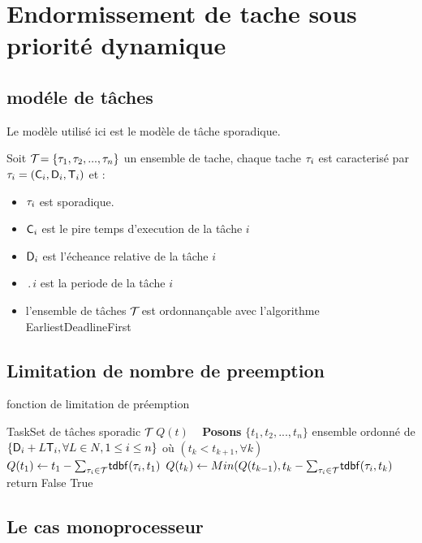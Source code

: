 \chapter{Endormissement de tache sous priorité dynamique}
\minitoc
\section{modéle de tâches}
Le modèle utilisé ici est le modèle de tâche sporadique.

Soit $\mathcal{T}_{} = \{\tau_{1},\tau_{2},...,\tau_{n}\}$ un ensemble de
tache, chaque tache $\tau_{i}$ est caracterisé par $\tau_{i} =
(\mathsf{C}_{i},\mathsf{D}_{i},\mathsf{T}_{i})$ et :

\begin{itemize}
\item $\tau_{i}$ est sporadique.
\item $\mathsf{C}_{i}$ est le pire temps d'execution de la t\^ache $i$
\item $\mathsf{D}_{i}$ est l'écheance relative de la t\^ache $i$
\item $\period{i}$ est la periode de la t\^ache $i$
\item l'ensemble de tâches $\mathcal{T}_{}$ est ordonnançable avec l'algorithme EarliestDeadlineFirst
\end{itemize}

\section{Limitation de nombre de preemption}

\begin{algorithm}
\caption{fonction de limitation de préemption}
\label{qt}
\begin{algorithmic}
\State TaskSet de tâches sporadic $\mathcal{T}_{}$
\State $Q(t)$
\State ~
\textbf{Posons} $\{t_{1},t_{2},...,t_{n}\}$ ensemble ordonné de $\{\mathsf{D}_{i}+L\mathsf{T}_{i},\forall L \in N, 1 \leq i \leq n \}$ où $(t_{k} < t_{k+1},\forall k)$
\State $Q(t_{1}) \leftarrow t_{1} - \sum_{\tau_{i} \in \mathcal{T}_{}} \mathsf{tdbf}({\tau_{i}},{t_{1}})$
\State $Q(t_{k}) \leftarrow Min(Q(t_{k-1}),t_{k} - \sum_{\tau_{i} \in \mathcal{T}_{}} \mathsf{tdbf}({\tau_{i}},{t_{k}})$
\State return False
\EndIf
\EndFor
\Return True
\end{algorithmic}
\end{algorithm}

\section{Le cas monoprocesseur}

